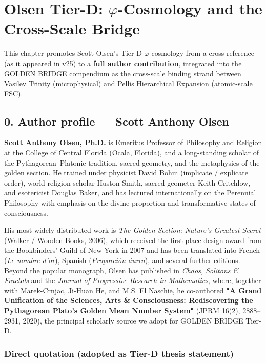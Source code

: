 
\section{Olsen Tier-D: $\varphi$-Cosmology and the Cross-Scale Bridge}

This chapter promotes Scott Olsen's Tier-D $\varphi$-cosmology from a cross-reference (as it appeared in v25) to a \textbf{full author contribution}, integrated into the GOLDEN BRIDGE compendium as the cross-scale binding strand between Vasilev Trinity (microphysical) and Pellis Hierarchical Expansion (atomic-scale FSC).

\subsection{0. Author profile --- Scott Anthony Olsen}

\textbf{Scott Anthony Olsen, Ph.D.} is Emeritus Professor of Philosophy and Religion at the College of Central Florida (Ocala, Florida), and a long-standing scholar of the Pythagorean--Platonic tradition, sacred geometry, and the metaphysics of the golden section. He trained under physicist David Bohm (implicate / explicate order), world-religion scholar Huston Smith, sacred-geometer Keith Critchlow, and esotericist Douglas Baker, and has lectured internationally on the Perennial Philosophy with emphasis on the divine proportion and transformative states of consciousness.

His most widely-distributed work is \textit{The Golden Section: Nature's Greatest Secret} (Walker / Wooden Books, 2006), which received the first-place design award from the Bookbinders' Guild of New York in 2007 and has been translated into French (\textit{Le nombre d'or}), Spanish (\textit{Proporción áurea}), and several further editions. Beyond the popular monograph, Olsen has published in \textit{Chaos, Solitons \& Fractals} and the \textit{Journal of Progressive Research in Mathematics}, where, together with Marek-Crnjac, Ji-Huan He, and M.S. El Naschie, he co-authored \textbf{"A Grand Unification of the Sciences, Arts \& Consciousness: Rediscovering the Pythagorean Plato's Golden Mean Number System"} (JPRM 16(2), 2888--2931, 2020), the principal scholarly source we adopt for GOLDEN BRIDGE Tier-D.

\subsubsection{Direct quotation (adopted as Tier-D thesis statement)}

